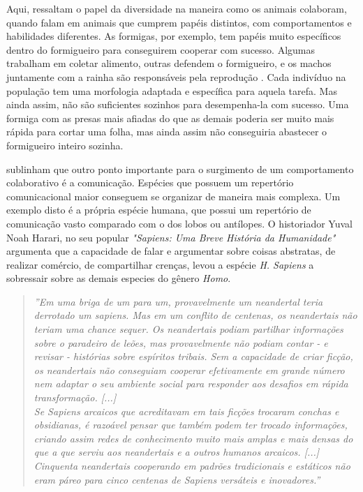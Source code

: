 Aqui,  ressaltam o papel da diversidade na maneira como os animais colaboram, quando falam em animais que cumprem papéis distintos, com comportamentos e habilidades diferentes. As formigas, por exemplo, tem papéis muito específicos dentro do formigueiro para conseguirem cooperar com sucesso. Algumas trabalham em coletar alimento, outras defendem o formigueiro, e os machos juntamente com a rainha são responsáveis pela reprodução \cite{maturana2001}. Cada indivíduo na população tem uma morfologia adaptada e específica para aquela tarefa. Mas ainda assim, não são suficientes sozinhos para desempenha-la com sucesso. Uma formiga com as presas mais afiadas do que as demais poderia ser muito mais rápida para cortar uma folha, mas ainda assim não conseguiria abastecer o formigueiro inteiro sozinha. 

 sublinham que outro ponto importante para o surgimento de um comportamento colaborativo é a comunicação. Espécies que possuem um repertório comunicacional maior conseguem se organizar de maneira mais complexa. Um exemplo disto é a própria espécie humana, que possui um repertório de comunicação vasto comparado com o dos lobos ou antílopes. O historiador Yuval Noah Harari, no seu popular \textit{"Sapiens: Uma Breve História da Humanidade"} argumenta que a capacidade de falar e argumentar sobre coisas abstratas, de realizar comércio, de compartilhar crenças, levou a espécie \textit{H. Sapiens} a sobressair sobre as demais especies do gênero \textit{Homo}.

\begin{quote}
\textit{''Em uma briga de um para um, provavelmente um neandertal teria derrotado um sapiens. Mas em um conflito de centenas, os neandertais não teriam uma chance sequer. Os neandertais podiam partilhar informações sobre o paradeiro de leões, mas provavelmente não podiam contar - e revisar - histórias sobre espíritos tribais. Sem a capacidade de criar ficção, os neandertais não conseguiam cooperar efetivamente em grande número nem adaptar o seu ambiente social para responder aos desafios em rápida transformação. [...] \\ Se Sapiens arcaicos que acreditavam em tais ficções trocaram conchas e obsidianas, é razoável pensar que também podem ter trocado informações, criando assim redes de conhecimento muito mais amplas e mais densas do que a que serviu aos neandertais e a outros humanos arcaicos. [...] \\
Cinquenta neandertais cooperando em padrões tradicionais e estáticos não eram páreo para cinco centenas de Sapiens versáteis e inovadores.''} \cite{harari2014}
\end{quote}

